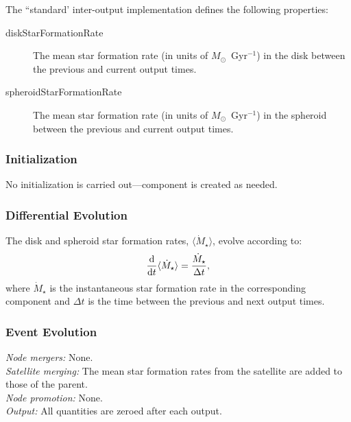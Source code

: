 The ``standard' inter-output implementation defines the following properties:
\begin{description}
 \item [{\normalfont \ttfamily diskStarFormationRate}] The mean star formation rate (in units of $M_\odot$~Gyr$^{-1}$) in the disk between the previous and current output times.
 \item [{\normalfont \ttfamily spheroidStarFormationRate}] The mean star formation rate (in units of $M_\odot$~Gyr$^{-1}$) in the spheroid between the previous and current output times.
\end{description}

\subsubsection{Initialization}

No initialization is carried out---component is created as needed.

\subsubsection{Differential Evolution}

The disk and spheroid star formation rates, $\langle \dot{M}_\star \rangle$, evolve according to:
\begin{equation}
{{\mathrm d} \over {\mathrm d} t} \langle \dot{M}_\star \rangle = {\dot{M}_\star \over \Delta t},
\end{equation}
where $\dot{M}_\star$ is the instantaneous star formation rate in the corresponding component and $\Delta t$ is the time between the previous and next output times.

\subsubsection{Event Evolution}

\noindent\emph{Node mergers:} None.\\

\noindent\emph{Satellite merging:} The mean star formation rates from the satellite are added to those of the parent.\\

\noindent\emph{Node promotion:} None.\\

\noindent\emph{Output:} All quantities are zeroed after each output.\\

